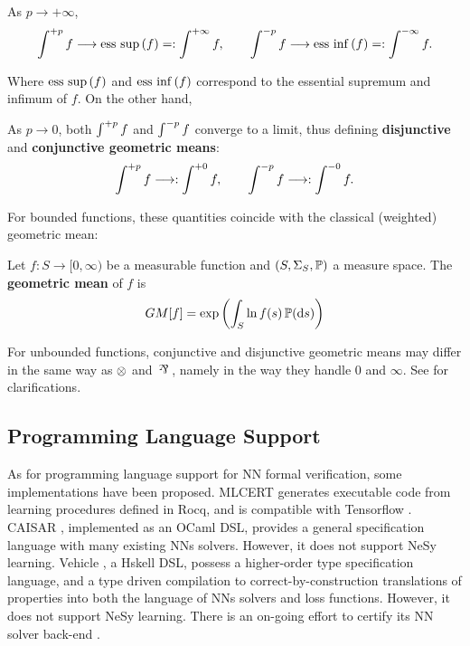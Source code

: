 \begin{lemma}
\label{limitinfty}
    As $p \longrightarrow +\infty$,
    \begin{equation}
        \LM{f}{+p} \longrightarrow \esup{f} =: \LM{f}{+\infty},
        \qquad
        \LM{f}{-p} \longrightarrow \einf{f} =: \LM{f}{-\infty}.
    \end{equation}
\end{lemma}

Where $\esup{f}$ and $\einf{f}$ correspond to the essential supremum and infimum of $f$. On the other hand, 

\begin{lemma}
\label{limitzero}
    As $p \longrightarrow 0$, both $\LM{f}{+p}$ and $\LM{f}{-p}$ converge to a limit, thus defining \textbf{disjunctive} and \textbf{conjunctive geometric means}:
    \begin{equation}
        \LM{f}{+p} \longrightarrow: \LM{f}{+0},
        \qquad
        \LM{f}{-p} \longrightarrow: \LM{f}{-0}.
    \end{equation}
\end{lemma}

For bounded functions, these quantities coincide with the classical (weighted) geometric mean:

\begin{definition}
    Let $f : S \rightarrow [0,\infty)$ be a measurable function and $(S,\sigmal{S}, \mathbb{P})$ a measure space. The \textbf{geometric mean} of $f$ is
    \begin{equation}
        GM[f] = \exp \left(\int_{S} \ln f(s)\, \mathbb{P}(\de s)\right)
    \end{equation}
\end{definition}

For unbounded functions, conjunctive and disjunctive geometric means may differ in the same way as $\conmul{}$ and $\dismul{}$, namely in the way they handle $0$ and $\infty$. See \cite{capucci2024quantifiers} for clarifications.

\subsection{Programming Language Support}

As for programming language support for NN formal verification, some implementations have been proposed. MLCERT generates executable code from  learning procedures defined in Rocq, and is compatible with Tensorflow \citep{bagnall2019certifying}. CAISAR \citep{girard2022caisar}, implemented as an OCaml DSL, provides a general specification language with many existing NNs solvers. However, it does not support NeSy learning. Vehicle \citep{vehicle}, a Hskell DSL, possess a higher-order type specification language, and a type driven compilation to correct-by-construction translations of properties into both the language of NNs solvers and loss functions. However, it does not support NeSy learning. There is an on-going effort to certify its NN solver back-end \citep{daggitt2023compiling, desmartin2022checkinn}. 

